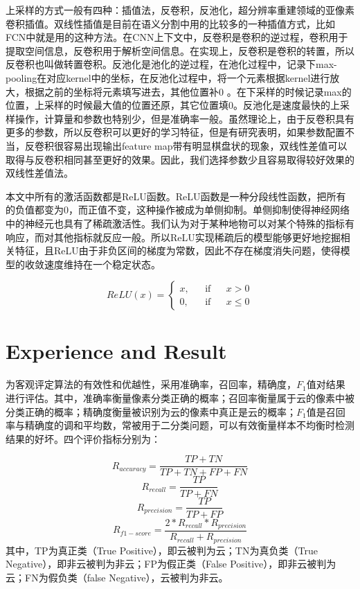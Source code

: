 \documentclass[UTF8]{ctexart}
\begin{document}
上采样的方式一般有四种：插值法，反卷积，反池化，超分辨率重建领域的亚像素卷积插值。双线性插值是目前在语义分割中用的比较多的一种插值方式，比如FCN中就是用的这种方法。在CNN上下文中，反卷积是卷积的逆过程，卷积用于提取空间信息，反卷积用于解析空间信息。在实现上，反卷积是卷积的转置，所以反卷积也叫做转置卷积。反池化是池化的逆过程，在池化过程中，记录下max-pooling在对应kernel中的坐标，在反池化过程中，将一个元素根据kernel进行放大，根据之前的坐标将元素填写进去，其他位置补0 。在下采样的时候记录max的位置，上采样的时候最大值的位置还原，其它位置填0。反池化是速度最快的上采样操作，计算量和参数也特别少，但是准确率一般。虽然理论上，由于反卷积具有更多的参数，所以反卷积可以更好的学习特征，但是有研究表明，如果参数配置不当，反卷积很容易出现输出feature map带有明显棋盘状的现象\cite{odena2016deconvolution}，双线性差值可以取得与反卷积相同甚至更好的效果。因此，我们选择参数少且容易取得较好效果的双线性差值法。


本文中所有的激活函数都是ReLU函数。ReLU函数是一种分段线性函数，把所有的负值都变为0，而正值不变，这种操作被成为单侧抑制。单侧抑制使得神经网络中的神经元也具有了稀疏激活性。我们认为对于某种地物可以对某个特殊的指标有响应，而对其他指标就反应一般。所以ReLU实现稀疏后的模型能够更好地挖掘相关特征，且ReLU由于非负区间的梯度为常数，因此不存在梯度消失问题，使得模型的收敛速度维持在一个稳定状态。

\begin{equation}
    ReLU(x)=\left\{
    \begin{aligned}
        x, & &\text{if} & & x > 0 \\
        0, & &\text{if} & & x \leq 0
    \end{aligned}
    \right.
\end{equation}


\section[]{Experience and Result}

为客观评定算法的有效性和优越性，采用准确率，召回率，精确度，$F_1$值对结果进行评估。其中，准确率衡量像素分类正确的概率；召回率衡量属于云的像素中被分类正确的概率；精确度衡量被识别为云的像素中真正是云的概率；$F_1$值是召回率与精确度的调和平均数，常被用于二分类问题，可以有效衡量样本不均衡时检测结果的好坏。四个评价指标分别为：

\begin{equation}
    R_{accuracy} = \frac{TP + TN}{TP + TN + FP + FN}\label{acc}
\end{equation}
\begin{equation}
    R_{recall} = \frac{TP}{TP + FN}\label{recall}
\end{equation}
\begin{equation}
    R_{precision} = \frac{TP}{TP + FP}\label{precision}
\end{equation}
\begin{equation}
    R_{f1-score} = \frac{2 * R_{recall} * R_{precision}}{R_{recall} + R_{precision}}\label{f1}
\end{equation}
其中，TP为真正类（True Positive），即云被判为云；TN为真负类（True Negative），即非云被判为非云；FP为假正类（False Positive），即非云被判为云；FN为假负类（false Negative），云被判为非云。
\end{document}
